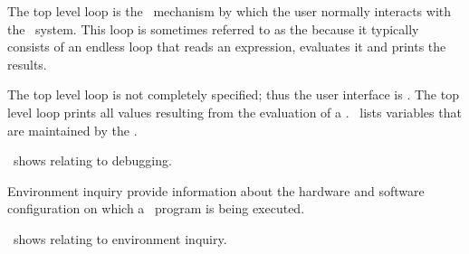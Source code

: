 
The top level loop is the \clisp\ mechanism by which the user normally
interacts with the \clisp\ system. This loop is sometimes referred to 
as the 
because it typically consists of an endless loop that reads an expression,
evaluates it and prints the results.

The top level loop is not completely specified; thus the user
interface is .
The top level loop 
prints all values resulting from the evaluation of a 
.
\Thenextfigure\ lists variables that are maintained by the .


\endSubsection%

 
\Thenextfigure\ shows  relating to
debugging.

 
\endsubsection%

Environment inquiry  provide information about
the hardware and software configuration on which a \clisp\ program is
being executed.

\Thenextfigure\ shows  relating to environment inquiry.


\endSubsection%


